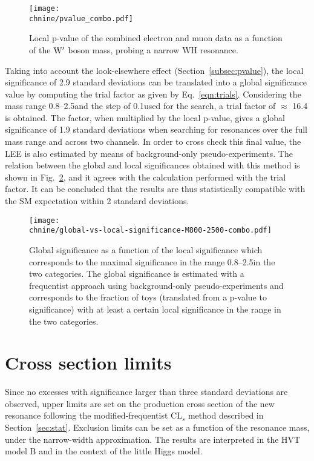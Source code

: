 \begin{figure}[htb]
\centering
     \texttt{[image: \\chnine/pvalue\_combo.pdf]}
\caption{
  Local p-value of the combined electron and muon data as a function of the $\mathrm{W}^\prime$ boson mass,
  probing a narrow WH resonance.
}
\label{fig:sigWH}
\end{figure}

Taking into account the look-elsewhere effect (Section~\ref{subsec:pvalue}), the local significance of 2.9 standard deviations can be translated into a global significance value by computing the trial factor as given by Eq.~\ref{eqn:trials}. 
Considering the mass range 0.8--2.5\TeV and the step of 0.1\TeV used for the search, a trial factor of $\approx$ 16.4 is obtained. The factor, when multiplied by the local p-value, gives a global significance of 1.9 standard deviations
when searching for resonances over the full mass range and across two channels.
In order to cross check this final value, the LEE is also estimated by means of background-only pseudo-experiments. The relation between the global and local significances obtained with this method is shown in Fig.~\ref{fig:sigGlobWH},
and it agrees with the calculation performed with the trial factor.
It can be concluded that the results are thus statistically compatible with the SM expectation within 2 standard deviations.

\begin{figure}[htb]
\centering
     \texttt{[image: \\chnine/global-vs-local-significance-M800-2500-combo.pdf]}
\caption{
  Global significance as a function of the local significance which corresponds to the maximal significance in the \mWH range 0.8--2.5\TeV in the two categories. The global significance is estimated with a frequentist approach using background-only pseudo-experiments and corresponds to the fraction of toys (translated from a p-value to significance) with at least a certain local significance in the \mWH range in the two categories.
}
\label{fig:sigGlobWH}
\end{figure}

\section{Cross section limits}

Since no excesses with significance larger than three standard deviations are observed, upper limits are set on the production cross section of the new resonance following the modified-frequentist $\mathrm{CL}_s$ method
described in Section~\ref{sec:stat}. Exclusion limits can be set as a function of the \Wpr resonance mass, under the narrow-width approximation.
The results are interpreted in the HVT model B and in the context of the little Higgs model.\\

